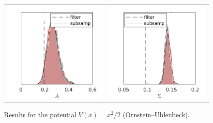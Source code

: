 \documentclass[10pt]{article}
\begin{document}
\begin{figure}[t]
	\centering 
	\begin{tabular}{cc}
		\includegraphics[]{Figures/A_OU.png} & 	\includegraphics[]{Figures/S_OU.png}
	\end{tabular}
	\caption{Results for the potential $V(x)=x^2/2$ (Ornstein--Uhlenbeck).}
	\label{fig:OU}
\end{figure}
\end{document}
